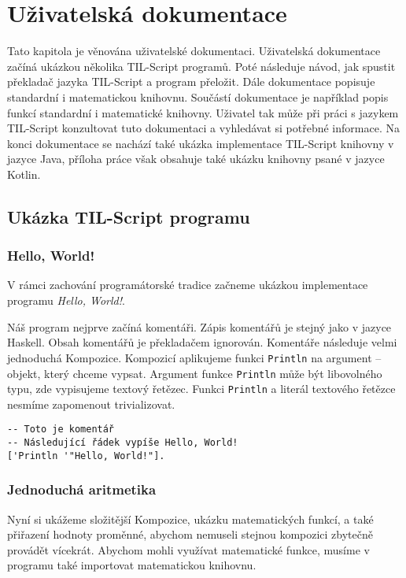 \chapter{Uživatelská dokumentace}

Tato kapitola je věnována uživatelské dokumentaci. Uživatelská dokumentace začíná ukázkou několika
TIL-Script programů. Poté následuje návod, jak spustit překladač jazyka TIL-Script a program
přeložit. Dále dokumentace popisuje standardní i matematickou knihovnu. Součástí dokumentace je
například popis funkcí standardní i matematické knihovny. Uživatel tak může při práci s jazykem
TIL-Script konzultovat tuto dokumentaci a vyhledávat si potřebné informace. Na konci dokumentace
se nachází také ukázka implementace TIL-Script knihovny v jazyce Java, příloha práce však obsahuje
také ukázku knihovny psané v jazyce Kotlin.

\section{Ukázka TIL-Script programu}

\subsection{Hello, World!}

V rámci zachování programátorské tradice začneme ukázkou implementace programu
\textit{Hello, World!}.

Náš program nejprve začíná komentáři. Zápis komentářů je stejný jako v jazyce Haskell. Obsah
komentářů je překladačem ignorován. Komentáře následuje velmi jednoduchá Kompozice. Kompozicí
aplikujeme funkci \lstinline{Println} na argument -- objekt, který chceme vypsat. Argument
funkce \lstinline{Println} může být
libovolného typu, zde vypisujeme textový řetězec. Funkci \lstinline{Println} a literál textového
řetězce nesmíme zapomenout trivializovat.

\begin{lstlisting}[caption={Program Hello, World! v jazyce TIL-Script}]
-- Toto je komentář
-- Následující řádek vypíše Hello, World!
['Println '"Hello, World!"].
\end{lstlisting}

\subsection{Jednoduchá aritmetika}

Nyní si ukážeme složitější Kompozice, ukázku matematických funkcí, a také přiřazení hodnoty
proměnné, abychom nemuseli stejnou kompozici zbytečně provádět vícekrát. Abychom mohli využívat
matematické funkce, musíme v programu také importovat matematickou knihovnu.

